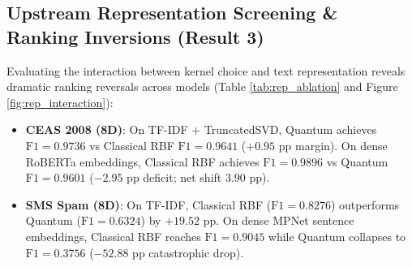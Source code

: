 \documentclass{article}
\begin{document}
\subsection{Upstream Representation Screening \& Ranking Inversions (Result 3)}
Evaluating the interaction between kernel choice and text representation reveals dramatic ranking reversals across models (Table \ref{tab:rep_ablation} and Figure \ref{fig:rep_interaction}):
\begin{itemize}
    \setlength{\itemsep}{2pt}
    \item \textbf{CEAS 2008 (8D)}: On TF-IDF + TruncatedSVD, Quantum achieves $\text{F1} = 0.9736$ vs Classical RBF $\text{F1} = 0.9641$ ($+0.95$ pp margin). On dense RoBERTa embeddings, Classical RBF achieves $\text{F1} = 0.9896$ vs Quantum $\text{F1} = 0.9601$ ($-2.95$ pp deficit; net shift $3.90$ pp).
    \item \textbf{SMS Spam (8D)}: On TF-IDF, Classical RBF ($\text{F1} = 0.8276$) outperforms Quantum ($\text{F1} = 0.6324$) by $+19.52$ pp. On dense MPNet sentence embeddings, Classical RBF reaches $\text{F1} = 0.9045$ while Quantum collapses to $\text{F1} = 0.3756$ ($-52.88$ pp catastrophic drop).
\end{itemize}

\begin{table}[!htbp]
\centering
\caption{Upstream Representation Screening and Ranking Reversals on CEAS 2008 and SMS Spam.}
\label{tab:rep_ablation}
\end{table}
\end{document}

